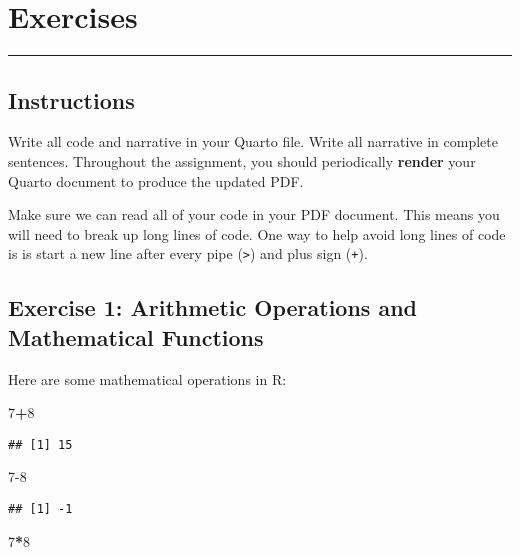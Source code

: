 \documentclass[
]{article}
\newenvironment{Shaded}{\begin{snugshade}}{\end{snugshade}}
\newcommand{\DecValTok}[1]{\textcolor[rgb]{0.00,0.00,0.81}{#1}}
\newcommand{\SpecialCharTok}[1]{\textcolor[rgb]{0.81,0.36,0.00}{\textbf{#1}}}
\begin{document}
\section{Exercises}\label{exercises}

\begin{center}\rule{0.5\linewidth}{0.5pt}\end{center}

\subsection{Instructions}\label{instructions}

Write all code and narrative in your Quarto file. Write all narrative in
complete sentences. Throughout the assignment, you should periodically
\textbf{render} your Quarto document to produce the updated PDF.

Make sure we can read all of your code in your PDF document. This means
you will need to break up long lines of code. One way to help avoid long
lines of code is is start a new line after every pipe
(\texttt{\textbar{}\textgreater{}}) and plus sign (\texttt{+}).

\subsection{Exercise 1: Arithmetic Operations and Mathematical
Functions}\label{exercise-1-arithmetic-operations-and-mathematical-functions}

Here are some mathematical operations in R:

\begin{Shaded}
\begin{Highlighting}[]
\DecValTok{7}\SpecialCharTok{+}\DecValTok{8}
\end{Highlighting}
\end{Shaded}

\begin{verbatim}
## [1] 15
\end{verbatim}

\begin{Shaded}
\begin{Highlighting}[]
\DecValTok{7{-}8}
\end{Highlighting}
\end{Shaded}

\begin{verbatim}
## [1] -1
\end{verbatim}

\begin{Shaded}
\begin{Highlighting}[]
\DecValTok{7}\SpecialCharTok{*}\DecValTok{8}
\end{Highlighting}
\end{Shaded}
\end{document}
